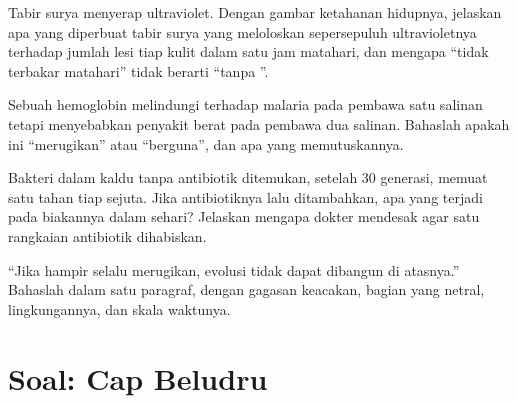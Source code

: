 \begin{exercise}[$\star\star\star$]\label{exo:g11:mutations:12}
Tabir surya menyerap ultraviolet. Dengan gambar ketahanan hidupnya,
jelaskan apa yang diperbuat tabir surya yang meloloskan sepersepuluh
ultravioletnya terhadap jumlah lesi tiap  kulit dalam satu jam
matahari, dan mengapa ``tidak terbakar matahari'' tidak berarti
``tanpa ''.
\end{exercise}

\begin{exercise}[$\star\star\star$]\label{exo:g11:mutations:13}
Sebuah   hemoglobin melindungi terhadap malaria pada pembawa
satu salinan tetapi menyebabkan penyakit berat pada pembawa dua
salinan. Bahaslah apakah  ini ``merugikan'' atau ``berguna'',
dan apa yang memutuskannya.
\end{exercise}

\begin{exercise}[$\star\star\star$]\label{exo:g11:mutations:14}
Bakteri dalam kaldu tanpa antibiotik ditemukan, setelah 30 generasi,
memuat satu  tahan tiap sejuta. Jika antibiotiknya lalu
ditambahkan, apa yang terjadi pada biakannya dalam sehari? Jelaskan
mengapa dokter mendesak agar satu rangkaian antibiotik dihabiskan.
\end{exercise}

\begin{exercise}[$\star\star\star$]\label{exo:g11:mutations:15}
``Jika  hampir selalu merugikan, evolusi tidak dapat dibangun di
atasnya.'' Bahaslah dalam satu paragraf, dengan gagasan keacakan,
bagian  yang netral, lingkungannya, dan skala waktunya.
\end{exercise}

\section{Soal: Cap Beludru}

